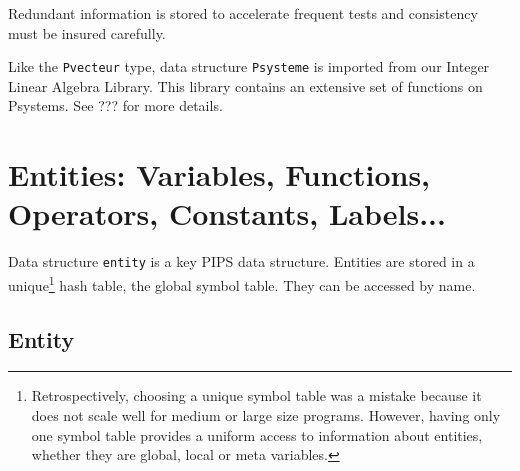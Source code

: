 \documentclass[a4paper]{article}
\begin{document}
Redundant information is stored to accelerate frequent tests and
consistency must be insured carefully.

\begin{comment}
Un Psysteme est form� de six champs:
\begin{itemize}
  \item une liste d'�galit�s,
  \item le nombre des �galit�s,
  \item une liste d'in�galit�s,
  \item le nombre d'in�galit�s,
  \item la dimension de l'espace de r�f�rence,
  \item une base de l'espace de r�f�rence.
\end{itemize}
\end{comment}

Like the \texttt{Pvecteur} type, data structure \texttt{Psysteme} is imported
from our Integer Linear Algebra Library. This library contains an
extensive set of functions on Psystems. See ??? for more details.

\begin{comment}
Comme le domaine Pvecteur, la structure de donn�es Psysteme est
import�e de la biblioth�que d'alg�bre lin�aire en nombres entiers du
CRI.
\end{comment}

\section{Entities: Variables, Functions, Operators, Constants, Labels...}
\label{entity}

Data structure \verb/entity/ is a key PIPS data structure. Entities are
stored in a unique\footnote{Retrospectively, choosing a unique symbol
table was a mistake because it does not scale well for medium or large
size programs. However, having only one symbol table provides a uniform
access to information about entities, whether they are global, local or
meta variables.} hash table, the global symbol table. They can be
accessed by name.

\subsection{Entity}
\label{subsection-entity}

\end{document}
